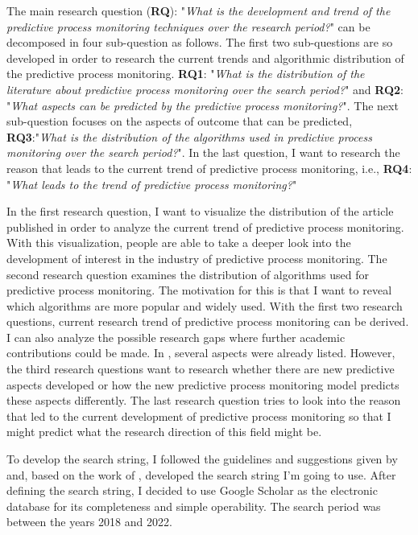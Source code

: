 \documentclass[runningheads]{llncs}
\begin{document}
		The main research question (\textbf{RQ}): "\textit{What is the development and trend of the predictive process monitoring techniques over the research period?}" can be decomposed in four sub-question as follows. The first two sub-questions are so developed in order to research the current trends and algorithmic distribution of the predictive process monitoring. \textbf{RQ1}: "\textit{What is the distribution of the literature about predictive process monitoring over the search period?}" and \textbf{RQ2}: "\textit{What aspects can be predicted by the predictive process monitoring?}". The next sub-question focuses on the aspects of outcome that can be predicted, \textbf{RQ3}:"\textit{What is the distribution of the algorithms used in predictive process monitoring over the search period?}". In the last question, I want to research the reason that leads to the current trend of predictive process monitoring, i.e., \textbf{RQ4}: "\textit{What leads to the trend of predictive process monitoring?}"
		
		In the first research question, I want to visualize the distribution of the article published in order to analyze the current trend of predictive process monitoring. With this visualization, people are able to take a deeper look into the development of interest in the industry of predictive process monitoring. The second research question examines the distribution of algorithms used for predictive process monitoring. The motivation for this is that I want to reveal which algorithms are more popular and widely used. With the first two research questions, current research trend of predictive process monitoring can be derived. I can also analyze the possible research gaps where further academic contributions could be made. In \cite{original}, several aspects were already listed. However, the third research questions want to research whether there are new predictive aspects developed or how the new predictive process monitoring model predicts these aspects differently. The last research question tries to look into the reason that led to the current development of predictive process monitoring so that I might predict what the research direction of this field might be.
		
		To develop the search string, I followed the guidelines and suggestions given by \cite{guideline} and, based on the work of \cite{original}, developed the search string I'm going to use. After defining the search string, I decided to use Google Scholar as the electronic database for its completeness and simple operability. The search period was between the years 2018 and 2022.
		
\end{document}
